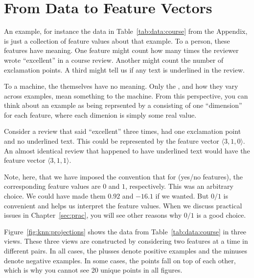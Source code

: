 \section{From Data to Feature Vectors}

An example, for instance the data in Table~\ref{tab:data:course} from
the Appendix, is just a collection of feature values about that example.  To
a person, these features have meaning.  One feature might count how
many times the reviewer wrote ``excellent'' in a course review.
Another might count the number of exclamation points.  A third might
tell us if any text is underlined in the review.

To a machine, the  themselves have no meaning.  Only
the , and how they vary across examples, mean
something to the machine.  From this perspective, you can think about
an example as being reprsented by a 
consisting of one ``dimension'' for each feature, where each dimenion
is simply some real value.

Consider a review that said ``excellent'' three times, had one
exclamation point and no underlined text.  This could be represented
by the feature vector $\langle 3, 1, 0 \rangle$.  An almost identical
review that happened to have underlined text would have the feature
vector $\langle 3,1,1\rangle$.

Note, here, that we have imposed the convention that for
 (yes/no features), the corresponding feature
values are $0$ and $1$, respectively.  This was an arbitrary choice.
We could have made them $0.92$ and $-16.1$ if we wanted.  But $0/1$ is
convenient and helps us interpret the feature values.  When we discuss
practical issues in Chapter~\ref{sec:prac}, you will see other reasons
why $0/1$ is a good choice.


Figure~\ref{fig:knn:projections} shows the data from
Table~\ref{tab:data:course} in three views.  These three views are
constructed by considering two features at a time in different pairs.
In all cases, the plusses denote positive examples and the minuses
denote negative examples.  In some cases, the points fall on top of
each other, which is why you cannot see 20 unique points in all
figures.


